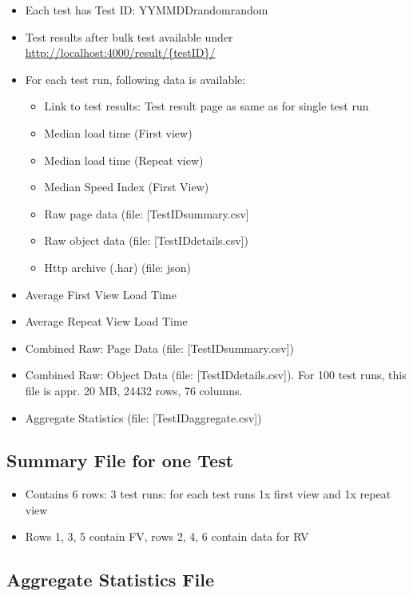 \begin{itemize}
\item Each test has Test ID: YYMMDD\textunderscore random\textunderscore random
\item Test results after bulk test available under \url{http://localhost:4000/result/{testID}/}
\item For each test run, following data is available:
	\begin{itemize}
	\item Link to test results: Test result page as same as for single test run
	\item Median load time (First view)
	\item Median load time (Repeat view)
	\item Median Speed Index (First View)
	\item Raw page data (file: [TestID\textunderscore summary.csv]
	\item Raw object data (file: [TestID\textunderscore details.csv])
	\item Http archive (.har) (file: json)
	\end{itemize}
	
\item Average First View Load Time
\item Average Repeat View Load Time
\item Combined Raw: Page Data  (file: [TestID\textunderscore summary.csv])
\item Combined Raw: Object Data (file: [TestID\textunderscore details.csv]). For 100 test runs, this file is appr. 20 MB, 24432 rows, 76 columns. 
\item Aggregate Statistics (file: [TestID\textunderscore aggregate.csv])
\end{itemize}


\subsection{Summary File for one Test}

\begin{itemize}
\item Contains 6 rows: 3 test runs: for each test runs 1x first view and 1x repeat view
\item Rows 1, 3, 5 contain FV, rows 2, 4, 6 contain data for RV
\end{itemize}

\subsection{Aggregate Statistics File}

